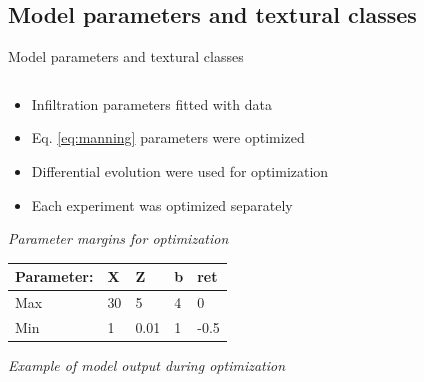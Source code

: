 \subsection{Model parameters and textural classes}
\begin{block}{Model parameters and textural classes}
\begin{columns}
    \begin{column}{0.2\textwidth}
            \begin{itemize}
                \item Infiltration parameters fitted with data
                \item Eq. \ref{eq:manning} parameters were optimized
                \item Differential evolution were used for optimization
                \item Each experiment was optimized separately
            \end{itemize}
            {\it Parameter margins for optimization}
        \begin{table}[]
            \small
            \begin{tabular}{lllll}
            \hline
            \hline
            Parameter: & X & Z & b & ret \\
            \hline
            Max & 30 & 5 & 4 & 0 \\
            Min & 1 & 0.01 & 1 & -0.5 \\
            \hline
            \hline
            \end{tabular}
        \end{table}
        \vspace{1.5cm}
        \justifying
        {\it Example of model output during optimization}
        

\end{column}
\end{columns}
\end{block}

